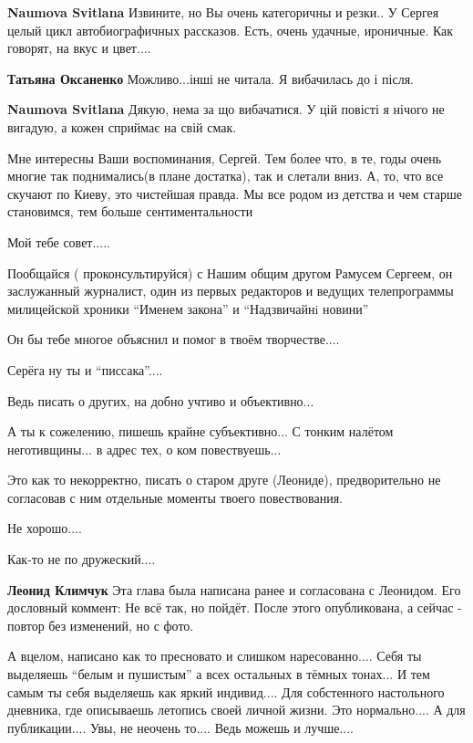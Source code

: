 \begin{itemize}
\begin{itemize} %
\textbf{Naumova Svitlana} Извините, но Вы очень категоричны и резки.. У Сергея целый цикл автобиографичных рассказов. Есть, очень удачные, ироничные. Как говорят, на вкус и цвет....

\textbf{Татьяна Оксаненко} Можливо...інші не читала. Я вибачилась до і після.

\textbf{Naumova Svitlana} Дякую, нема за що вибачатися. У цій повісті я нічого не вигадую, а кожен сприймає на свій смак.
\end{itemize} %


Мне интересны Ваши воспоминания, Сергей. Тем более что, в те, годы очень многие
так поднимались(в плане достатка), так и слетали вниз. А, то, что все скучают
по Киеву, это чистейшая правда. Мы все родом из детства и чем старше
становимся, тем больше сентиментальности


Мой тебе совет.....

Пообщайся ( проконсультируйся) с Нашим общим другом Рамусем Сергеем, он
заслужанный журналист, один из первых редакторов и ведущих телепрограммы
милицейской хроники \enquote{Именем закона} и \enquote{Надзвичайнi новини}

Он бы тебе многое объяснил и помог в твоём творчестве....


Серёга ну ты и \enquote{писсака}....

Ведь писать о других, на добно учтиво и объективно...

А ты к сожелению, пишешь крайне субъективно... С тонким налётом неготивщины...
в адрес тех, о ком повествуешь...

Это как то некорректно, писать о старом друге (Леониде), предворительно не
согласовав с ним отдельные моменты твоего повествования.

Не хорошо....

Как-то не по дружеский....

\begin{itemize} %
\textbf{Леонид Климчук} Эта глава была написана ранее и согласована с Леонидом. Его дословный коммент: Не всё так, но пойдёт. После этого опубликована, а сейчас - повтор без изменений, но с фото.
\end{itemize} %


А вцелом, написано как то пресновато и слишком наресованно....
Себя ты выделяешь \enquote{белым и пушистым} а всех остальных в тёмных тонах...
И тем самым ты себя выделяешь как яркий индивид....
Для собстенного настольного дневника, где описываешь летопись своей личной жизни. Это нормально....
А для публикации....
Увы, не неочень то....
Ведь можешь и лучше....


\end{itemize}
